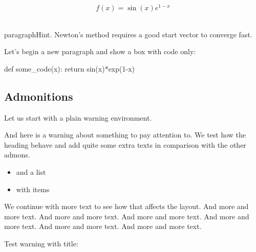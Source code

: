 \documentclass[%
oneside,                 %
final,                   %
10pt]{article}
\newenvironment{warning_mdfboxadmon}[1][]{
\begin{warning_mdfboxmdframed}[frametitle=#1]
}
{
\end{warning_mdfboxmdframed}
}
\begin{document}
\begin{center}
\begin{Sbox}
\begin{minipage}{0.85\linewidth}
\begin{equation} f(x) = \sin(x)e^{1-x} \end{equation}
\end{minipage}
\end{Sbox}
\fbox{\TheSbox}
\end{center}

\\paragraph{Hint.}\n
Newton's method requires a good start vector to converge fast.



Let's begin a new paragraph and show a box with code only:


\begin{center}
\begin{Sbox}
\begin{minipage}{0.85\linewidth}
\bpycod
def some_code(x):
    return sin(x)*exp(1-x)
\epycod
\end{minipage}
\end{Sbox}
\fbox{\TheSbox}
\end{center}

\subsection{Admonitions}

Let us start with a plain warning environment.


\begin{warning_mdfboxadmon}[Warning.]
And here is a warning about something to pay attention to. We
test how the heading behave and add quite some extra texts
in comparison with the other admons.

\begin{itemize}
  \item and a list

  \item with items
\end{itemize}

\noindent
We continue with more text to see how that affects the layout.
And more and more text.
And more and more text.
And more and more text.
And more and more text.
And more and more text.
And more and more text.
\end{warning_mdfboxadmon} %



Test warning with title:
\end{document}
